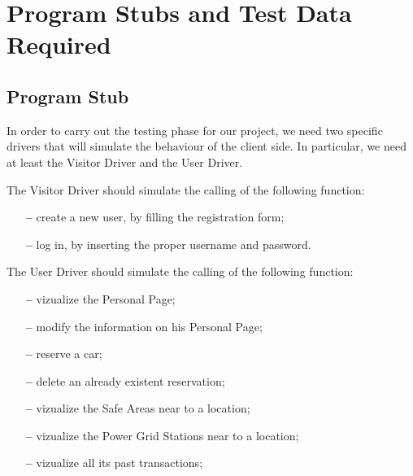 \section{Program Stubs and Test Data Required} \label{sec:pstdr}

\subsection{Program Stub}

In order to carry out the testing phase for our project, we need two specific drivers that will simulate the behaviour of the client side.
In particular, we need at least the Visitor Driver and the User Driver.
\newline

The Visitor Driver should simulate the calling of the following function:

\begin{itemize}

\item[\textbf{--}] create a new user, by filling the registration form;

\item[\textbf{--}] log in, by inserting the proper username and password.

\end{itemize}

The User Driver should simulate the calling of the following function:

\begin{itemize}

\item[\textbf{--}] vizualize the Personal Page;

\item[\textbf{--}] modify the information on his Personal Page;

\item[\textbf{--}] reserve a car;

\item[\textbf{--}] delete an already existent reservation;

\item[\textbf{--}] vizualize the Safe Areas near to a location;

\item[\textbf{--}] vizualize the Power Grid Stations near to a location;

\item[\textbf{--}] vizualize all its past transactions;

\end{itemize}

